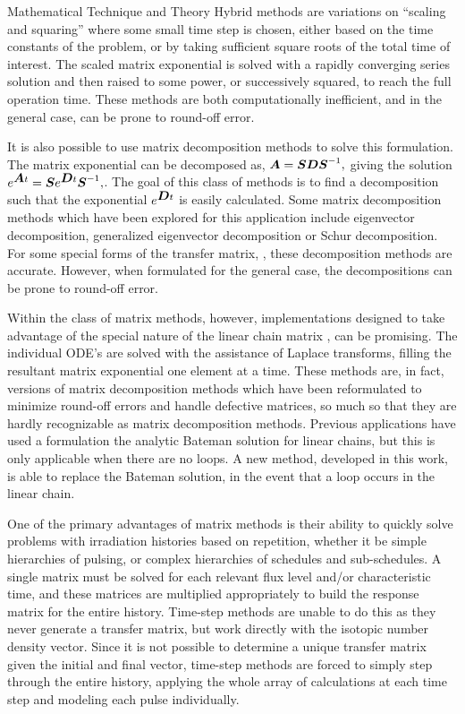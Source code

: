 \begin{chapter}{Mathematical Technique and Theory}
Hybrid methods are variations on ``scaling and squaring'' where some
small time step is chosen, either based on the time constants of the
problem, or by taking sufficient square roots of the total time of
interest.  The scaled matrix exponential is solved with a rapidly
converging series solution and then raised to some power, or
successively squared, to reach the full operation time.  These methods
are both computationally inefficient, and in the general case, can be
prone to round-off error.

It is also possible to use matrix decomposition methods to solve this
formulation.  The matrix exponential can be decomposed as, $\mbox{\boldmath $A$} =
\mbox{\boldmath $S$}\mbox{\boldmath $D$}\mbox{\boldmath $S$}^{-1},$ giving the solution $e^{\mbox{\boldmath $A$} t} =
\mbox{\boldmath $S$}e^{\mbox{\boldmath $D$} t}\mbox{\boldmath $S$}^{-1},$.  The goal of this class of methods
is to find a decomposition such that the exponential $e^{\mbox{\boldmath $D$} t}$
is easily calculated. Some matrix decomposition methods which have
been explored for this application include eigenvector
decomposition\cite{eigenvectors}, generalized eigenvector
decomposition\cite{GERAPH} or Schur decomposition\cite{RACCP}.  For
some special forms of the transfer matrix, , these
decomposition methods are accurate.  However, when formulated for the
general case, the decompositions can be prone to round-off error.

Within the class of matrix methods, however, implementations designed
to take advantage of the special nature of the linear chain matrix
, can be promising.  The individual ODE's are solved with the
assistance of Laplace transforms, filling the resultant matrix
exponential one element at a time.  These methods are, in fact,
versions of matrix decomposition methods which have been reformulated
to minimize round-off errors and handle defective matrices, so much so
that they are hardly recognizable as matrix decomposition methods.
Previous applications have used a formulation the analytic
Bateman\cite{DKR,DKRICF,DKRP} solution for linear chains, but this is
only applicable when there are no loops.  A new method, developed in
this work, is able to replace the Bateman solution, in the event that
a loop occurs in the linear chain.

One of the primary advantages of matrix methods is their ability to
quickly solve problems with irradiation histories based on repetition,
whether it be simple hierarchies of pulsing, or complex hierarchies of
schedules and sub-schedules.  A single matrix must be solved for each
relevant flux level and/or characteristic time, and these matrices are
multiplied appropriately to build the response matrix for the entire
history.  Time-step methods are unable to do this as they never
generate a transfer matrix, but work directly with the isotopic number
density vector.  Since it is not possible to determine a unique
transfer matrix given the initial and final vector, time-step methods
are forced to simply step through the entire history, applying the
whole array of calculations at each time step and modeling each pulse
individually.


\end{chapter}
